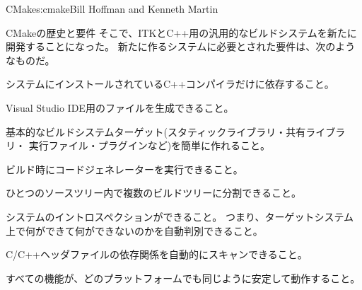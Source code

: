 \begin{aosachapter}{CMake}{s:cmake}{Bill Hoffman and Kenneth Martin}
\begin{aosasect1}{CMakeの歴史と要件}
そこで、ITKとC++用の汎用的なビルドシステムを新たに開発することになった。
新たに作るシステムに必要とされた要件は、次のようなものだ。

\begin{aosaitemize}

  \item システムにインストールされているC++コンパイラだけに依存すること。

  \item Visual Studio IDE用のファイルを生成できること。

  \item 基本的なビルドシステムターゲット(スタティックライブラリ・共有ライブラリ・
  実行ファイル・プラグインなど)を簡単に作れること。

  \item ビルド時にコードジェネレーターを実行できること。

  \item ひとつのソースツリー内で複数のビルドツリーに分割できること。

  \item システムのイントロスペクションができること。
  つまり、ターゲットシステム上で何ができて何ができないのかを自動判別できること。

  \item C/C++ヘッダファイルの依存関係を自動的にスキャンできること。

  \item すべての機能が、どのプラットフォームでも同じように安定して動作すること。


\end{aosaitemize}
\end{aosasect1}
\end{aosachapter}
